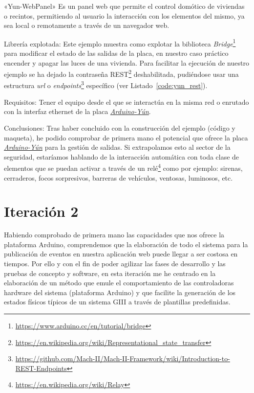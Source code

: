 \begin{definitionlist}
\item[«Yun-WebPanel»] Es un panel web que permite el control domótico de viviendas o recintos, permitiendo al usuario la interacción con los elementos del mismo, ya sea local  o remotamente a través de un navegador web. 

\item[Librería explotada:] Este ejemplo muestra como explotar la biblioteca \textit{Bridge}\footnote{\url{https://www.arduino.cc/en/tutorial/bridge}} para modificar el estado de las salidas de la placa, en nuestro caso práctico encender y apagar las luces de una vivienda. Para facilitar la ejecución de nuestro ejemplo se ha dejado la contraseña \acs{REST}\footnote{\url{https://en.wikipedia.org/wiki/Representational_state_transfer}} deshabilitada, pudiéndose usar una  estructura \textit{url} o \textit{endpoints}\footnote{\url{https://github.com/Mach-II/Mach-II-Framework/wiki/Introduction-to-REST-Endpoints}} específico (ver Listado~\ref{code:yun_rest}).

\hfill


\item[Requisitos:] Tener el equipo desde el que se interactúa en la misma red o enrutado con la interfaz ethernet de la placa \hyperref[tab:arduino-yun]{\textit{Arduino-Yún}}.

\item[Conclusiones:] Tras haber concluido con la construcción del ejemplo (código y maqueta), he podido comprobar de primera mano el potencial que ofrece la placa \hyperref[tab:arduino-yun]{\textit{Arduino-Yún}} para la gestión de salidas. Si extrapolamos esto al sector de la seguridad, estaríamos hablando de la interacción automática con toda clase de elementos que se puedan activar a través de un relé\footnote{\url{https://en.wikipedia.org/wiki/Relay}} como por ejemplo: sirenas, cerraderos, focos sorpresivos, barreras de vehículos, ventosas, luminosos, etc.

\end{definitionlist}

\section{Iteración 2}

Habiendo comprobado de primera mano las capacidades que nos ofrece la plataforma Arduino, comprendemos que la elaboración de todo el sistema para la publicación de eventos en nuestra aplicación web puede llegar a ser costosa en tiempos. Por ello y con el fin de poder agilizar las fases de desarrollo y las pruebas de concepto y software, en esta iteración me he centrado en la elaboración de un método que emule el comportamiento de las controladoras hardware del sistema (plataforma Arduino) y que facilite la generación de los estados físicos típicos de un sistema \acs{GIII} a través de plantillas predefinidas.

